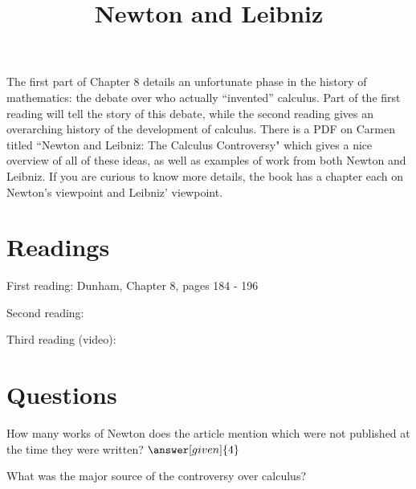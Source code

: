 \documentclass[nooutcomes]{ximera}
\title{Newton and Leibniz}
\begin{document}
\begin{abstract}
    
\end{abstract}
\maketitle

The first part of Chapter 8 details an unfortunate phase in the history of mathematics: the debate over who actually ``invented'' calculus.  Part of the first reading will tell the story of this debate, while the second reading gives an overarching history of the development of calculus.  There is a PDF on Carmen titled ``Newton and Leibniz: The Calculus Controversy" which gives a nice overview of all of these ideas, as well as examples of work from both Newton and Leibniz. If you are curious to know more details, the book  has a chapter each on Newton's viewpoint and Leibniz' viewpoint.




\section{Readings}
First reading: Dunham, Chapter 8, pages 184 - 196

Second reading: 

Third reading (video): 


\section{Questions}

\begin{question}
How many works of Newton does the article mention which were not published at the time they were written?
$\answer[given]{4}$
\end{question}

\begin{question}
What was the major source of the controversy over calculus?
\begin{multipleChoice}
\end{multipleChoice}
\end{question}


%
\end{document}
